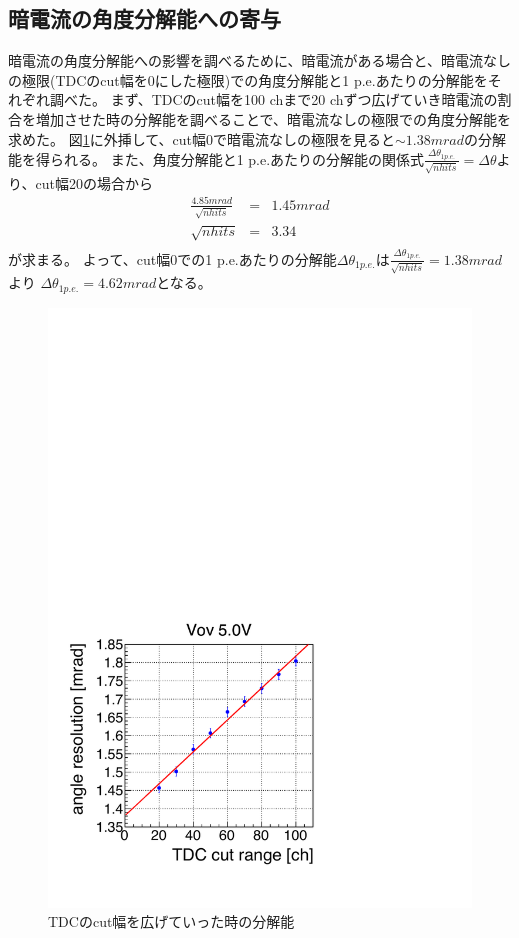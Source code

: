 \documentclass[uplatex, titlepage, dvipdfmx, 12pt, a4paper]{jsreport}
\begin{document}
    \subsection{暗電流の角度分解能への寄与}
    暗電流の角度分解能への影響を調べるために、暗電流がある場合と、暗電流なしの極限(TDCのcut幅を0にした極限)での角度分解能と1 p.e.あたりの分解能をそれぞれ調べた。
    まず、TDCのcut幅を100 chまで20 chずつ広げていき暗電流の割合を増加させた時の分解能を調べることで、暗電流なしの極限での角度分解能を求めた。
    図\ref{fig:reso_tdc}に外挿して、cut幅0で暗電流なしの極限を見ると$\sim 1.38 \si{mrad}$の分解能を得られる。
    また、角度分解能と1 p.e.あたりの分解能の関係式$\frac{\Delta \theta_{1 p.e.}}{\sqrt{nhits}}=\Delta \theta$より、cut幅20の場合から
    \begin{eqnarray}
      \frac{4.85 \si{mrad}}{\sqrt{nhits}}&=&1.45 \si{mrad} \nonumber \\
      \sqrt{nhits} &=& 3.34 \nonumber \\
    \end{eqnarray}
    が求まる。
    よって、cut幅0での1 p.e.あたりの分解能$\Delta \theta_{1 p.e.}$は$\frac{\Delta \theta_{1 p.e.}}{\sqrt{nhits}}=1.38 \si{mrad}$より
    $\Delta\theta_{1 p.e.}=4.62 \si{mrad}$となる。
    \begin{figure}[h]
      \begin{center} 
        \includegraphics[scale=0.4, clip]{image/reso_tdc.pdf}
        \caption{TDCのcut幅を広げていった時の分解能} 
        \label{fig:reso_tdc} 
      \end{center}
    \end{figure}
\end{document}
